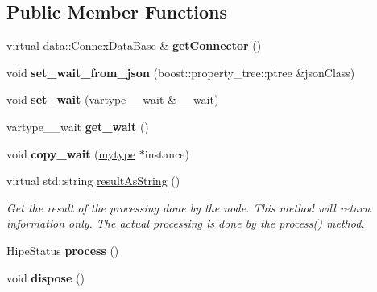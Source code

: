 \subsection*{Public Member Functions}
\begin{DoxyCompactItemize}
\item 
\mbox{\label{classfilter_1_1algos_1_1_cropper_aaf461702ce09f1f72ac270f4724ebf2f}} 
virtual \hyperlink{classfilter_1_1data_1_1_connex_data_base}{data\+::\+Connex\+Data\+Base} \& {\bfseries get\+Connector} ()
\item 
\mbox{\label{classfilter_1_1algos_1_1_cropper_a8654c44540b0823032b0a78a8ab537fa}} 
void {\bfseries set\+\_\+wait\+\_\+from\+\_\+json} (boost\+::property\+\_\+tree\+::ptree \&json\+Class)
\item 
\mbox{\label{classfilter_1_1algos_1_1_cropper_a385b712ebd79b5c12fcd14d3b08f6454}} 
void {\bfseries set\+\_\+wait} (vartype\+\_\+\+\_\+wait \&\+\_\+\+\_\+wait)
\item 
\mbox{\label{classfilter_1_1algos_1_1_cropper_a8374338b813a8372844a66ba01531aa1}} 
vartype\+\_\+\+\_\+wait {\bfseries get\+\_\+wait} ()
\item 
\mbox{\label{classfilter_1_1algos_1_1_cropper_af125f693a714d3cf00b53b7560c3fbad}} 
void {\bfseries copy\+\_\+wait} (\hyperlink{classfilter_1_1algos_1_1_cropper}{mytype} $\ast$instance)
\item 
virtual std\+::string \hyperlink{classfilter_1_1algos_1_1_cropper_ae970d5d448587b8288aca2484f12f2fa}{result\+As\+String} ()
\begin{DoxyCompactList}\small\item\em Get the result of the processing done by the node. This method will return information only. The actual processing is done by the process() method. \end{DoxyCompactList}\item 
\mbox{\label{classfilter_1_1algos_1_1_cropper_a34450cda9e5468d6f37f0c5281fe225e}} 
Hipe\+Status {\bfseries process} ()
\item 
\mbox{\label{classfilter_1_1algos_1_1_cropper_af8c56025560a142af00defbb74d228d6}} 
void {\bfseries dispose} ()
\end{DoxyCompactItemize}
